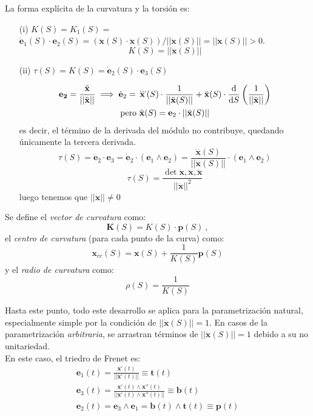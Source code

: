 La forma explícita de la curvatura y la torsión es:
\begin{enumerate}
    \item[(i)] $K(S)=K_1(S)=$
    $\dot{\mathbf{e}}_1(S)\cdot \mathbf{e}_2(S)=(\ddot{\mathbf{x}}(S)\cdot \ddot{\mathbf{x}}(S))/||\ddot{\mathbf{x}}(S)||=||\ddot{\mathbf{x}}(S)||>0$.
    $$
    \boxed{K(S)=||\ddot{\mathbf{x}}(S)||}
    $$ 

    \item[(ii)] $\tau(S)=K(S)=\dot{\mathbf{e}}_2(S)\cdot \mathbf{e}_3(S)$

    \begin{gather*}
        \mathbf{e_2}=\frac{\ddot{\mathbf{x}}}{||\ddot{\mathbf{x}}||}\implies \dot{\mathbf{e}}_2=\dddot{\mathbf{x}}(S)\cdot \frac{1}{||\ddot{\mathbf{x}}(S)||}+\ddot{\mathbf{x}}(S)\cdot \dv{}{S}\left ( \frac{1}{||\ddot{\mathbf{x}}||} \right ) \\
        \text{pero } \ddot{\mathbf{x}}(S)=\mathbf{e}_2\cdot ||\ddot{\mathbf{x}}(S)||
    \end{gather*}
    es decir, el término de la derivada del módulo no contribuye, quedando únicamente la tercera derivada.
    $$
    \tau(S)=\dot{\mathbf{e}}_2\cdot \mathbf{e}_3=\dot{\mathbf{e}}_2\cdot (\mathbf{e}_1 \wedge \mathbf{e}_2)=\frac{\dddot{\mathbf{x}}(S)}{||\ddot{\mathbf{x}}(S)||}\cdot (\mathbf{e}_1 \wedge \mathbf{e}_2)
    $$
    $$
    \boxed{\tau(S)=\frac{\det{\dot{\mathbf{x}},\ddot{\mathbf{x}},\dddot{\mathbf{x}}}}{||\ddot{\mathbf{x}}||^2}}
    $$
    luego tenemos que $||\ddot{\mathbf{x}}||\neq 0$
\end{enumerate}

Se define el \emph{vector de curvatura} como:
$$
\boxed{\mathbf{K}(S)=K(S)\cdot \mathbf{p}(S)} \ ,
$$
el \emph{centro de curvatura} (para cada punto de la curva) como:
$$
\boxed{\mathbf{x}_{cc}(S)=\mathbf{x}(S)+\frac{1}{K(S)}\mathbf{p}(S)}
$$
y el \emph{radio de curvatura} como:
$$
\boxed{\rho(S)=\frac{1}{K(S)}}
$$

Hasta este punto, todo este desarrollo se aplica para la parametrización natural, especialmente simple por la condición de $||\dot{\mathbf{x}}(S)||=1$. En casos de la parametrización \emph{arbitraria}, se arrastran términos de $||\dot{\mathbf{x}}(S)||=1$ debido a su no unitariedad.\\

En este caso, el triedro de Frenet es:
\begin{gather*}
    \mathbf{e}_1(t)=\frac{\mathbf{x'}(t)}{||\mathbf{x'}(t)||}\equiv \mathbf{t}(t)\\
    \mathbf{e}_3(t)=\frac{\mathbf{x'}(t)\wedge \mathbf{x''}(t)}{||\mathbf{x'}(t)\wedge \mathbf{x''}(t)||}\equiv \mathbf{b}(t)\\
    \mathbf{e}_2(t)=\mathbf{e}_3\wedge \mathbf{e}_1=\mathbf{b}(t)\wedge \mathbf{t}(t)\equiv \mathbf{p}(t)
\end{gather*}

